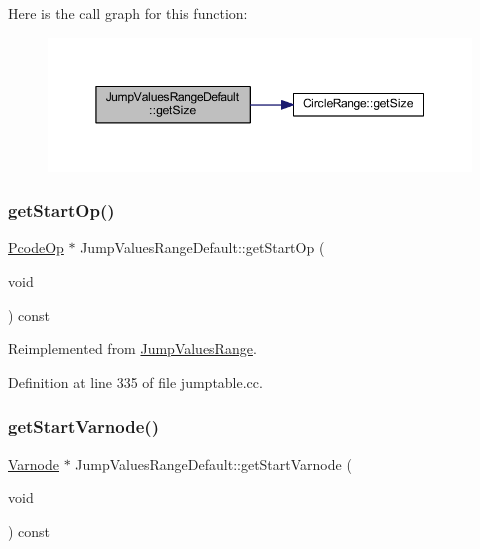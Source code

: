 Here is the call graph for this function\+:
\nopagebreak
\begin{figure}[H]
\begin{center}
\leavevmode
\includegraphics[width=350pt]{class_jump_values_range_default_a079bd26853aa52ccac577fd39c1a3e3e_cgraph}
\end{center}
\end{figure}
\mbox{\label{class_jump_values_range_default_a57e9f0efc13c6864527cc0b1aa2017a7}} 
\subsubsection{\texorpdfstring{getStartOp()}{getStartOp()}}
{\footnotesize\ttfamily \mbox{\hyperlink{class_pcode_op}{Pcode\+Op}} $\ast$ Jump\+Values\+Range\+Default\+::get\+Start\+Op (\begin{DoxyParamCaption}\item[{void}]{ }\end{DoxyParamCaption}) const\hspace{0.3cm}{\ttfamily [virtual]}}



Reimplemented from \mbox{\hyperlink{class_jump_values_range_a22ef1c5380849124e596224bac24413e}{Jump\+Values\+Range}}.



Definition at line 335 of file jumptable.\+cc.

\mbox{\label{class_jump_values_range_default_a65b5aaf23fe237b5feb699050f75da54}} 
\subsubsection{\texorpdfstring{getStartVarnode()}{getStartVarnode()}}
{\footnotesize\ttfamily \mbox{\hyperlink{class_varnode}{Varnode}} $\ast$ Jump\+Values\+Range\+Default\+::get\+Start\+Varnode (\begin{DoxyParamCaption}\item[{void}]{ }\end{DoxyParamCaption}) const\hspace{0.3cm}{\ttfamily [virtual]}}



